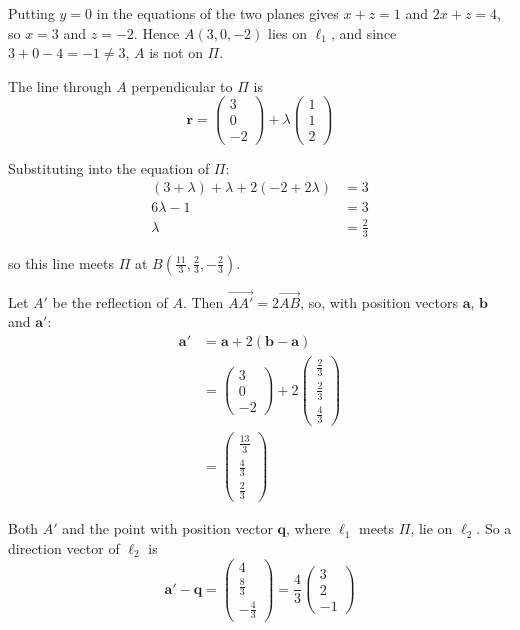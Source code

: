 \documentclass[leqno]{article}
\begin{document}
\begin{enumerate}[
  label=\textbf{\arabic*.},
  leftmargin=*,
  topsep=0pt,
  partopsep=0pt,
  parsep=0pt
]
\begin{djsSolution}
{Putting \(y=0\) in the equations of the two planes gives \(x+z=1\) and \(2x+z=4\), so \(x=3\) and \(z=-2\). Hence \(A(3,0,-2)\) lies on \(\ell_1\), and since \(3+0-4=-1\neq3\), \(A\) is not on \(\Pi\).

The line through \(A\) perpendicular to \(\Pi\) is
\[
\mathbf r=\begin{pmatrix}3\\0\\-2\end{pmatrix}+\lambda\begin{pmatrix}1\\1\\2\end{pmatrix}
\]

Substituting into the equation of \(\Pi\):
\begin{align*}
(3+\lambda)+\lambda+2(-2+2\lambda)&=3\\
6\lambda-1&=3\\
\lambda&=\frac23
\end{align*}

so this line meets \(\Pi\) at \(B\left(\frac{11}{3},\frac23,-\frac23\right)\).

Let \(A'\) be the reflection of \(A\). Then \(\overrightarrow{AA'}=2\overrightarrow{AB}\), so, with position vectors \(\mathbf a\), \(\mathbf b\) and \(\mathbf a'\):
\begin{align*}
\mathbf a'&=\mathbf a+2(\mathbf b-\mathbf a)\\
&=\begin{pmatrix}3\\0\\-2\end{pmatrix}+2\begin{pmatrix}\frac23\\[2pt]\frac23\\[2pt]\frac43\end{pmatrix}\\
&=\begin{pmatrix}\frac{13}{3}\\[2pt]\frac43\\[2pt]\frac23\end{pmatrix}
\end{align*}

Both \(A'\) and the point with position vector \(\mathbf q\), where \(\ell_1\) meets \(\Pi\), lie on \(\ell_2\). So a direction vector of \(\ell_2\) is
\[
\mathbf a'-\mathbf q
=\begin{pmatrix}4\\[2pt]\frac83\\[2pt]-\frac43\end{pmatrix}
=\frac43\begin{pmatrix}3\\2\\-1\end{pmatrix}
\]

}
\end{djsSolution}
\end{enumerate}
\end{document}
